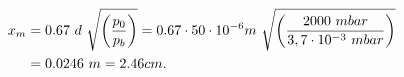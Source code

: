 \begin{equation}
   \begin{split}
   x_m & =0.67 \ d \ \sqrt{\left(\frac{p_0}{p_b}\right)} = 0.67 \cdot 50 \cdot 10^{-6} m \    \sqrt{\left(\frac{2000 \ mbar}{3,7 \cdot 10^{-3}\ mbar}\right)}\\ 
   \centering
   & = 0.0246\ m = 2.46 cm.
   \end{split}
\end{equation}

 
